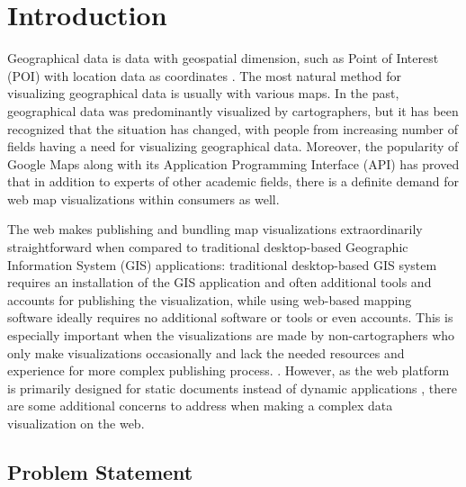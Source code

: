 
\chapter{Introduction}
\label{chapter:intro}


Geographical data is data with geospatial dimension, such as Point of Interest (POI) with location data as coordinates \citep[chap.~1.2]{kraak_cartography_2011}. The most natural method for visualizing geographical data is usually with various maps. In the past, geographical data was predominantly visualized by cartographers, but it has been recognized \citep{kraak_visualization_1999} that the situation has changed, with people from increasing number of fields having a need for visualizing geographical data. Moreover, the popularity of Google Maps \citep{google_maps_2005-1} along with its Application Programming Interface (API) \citep{google_maps_2005} has proved that in addition to experts of other academic fields, there is a definite demand for web map visualizations within consumers as well. 

The web makes publishing and bundling map visualizations extraordinarily straightforward when compared to traditional desktop-based Geographic Information System (GIS) applications: traditional desktop-based GIS system requires an installation of the GIS application and often additional tools and accounts for publishing the visualization, while using web-based mapping software ideally requires no additional software or tools or even accounts. This is especially important when the visualizations are made by non-cartographers who only make visualizations occasionally and lack the needed resources and experience for more complex publishing process. . However, as the web platform is primarily designed for static documents instead of dynamic applications \citep{berners-lee_information_1989,berners-lee_world-wide_1992}, there are some additional concerns to address when making a complex data visualization on the web.



\section{Problem Statement}

